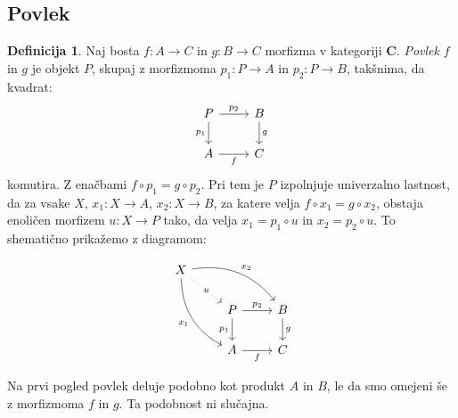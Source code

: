 \documentclass[12pt,a4paper]{book}
\theoremstyle{definition}
\newtheorem{definicija}{Definicija}[chapter]
\theoremstyle{plain}
\theoremstyle{definition}
\theoremstyle{remark}
\newcommand{\cat}[1]{\textbf{#1}}
\begin{document}
\subsection{Povlek}

\begin{definicija}
Naj bosta $f : A \to C$ in $g : B \to C$ morfizma v kategoriji $\cat{C}$. \emph{Povlek} $f$ in $g$ je objekt $P$, skupaj z morfizmoma $p_1 : P \to A$ in $p_2 : P \to B$, takšnima, da kvadrat:
$$
\begin{tikzcd}
P \ar[d, "p_1"'] \ar[r, "p_2"] & B \ar[d, "g"] \\
A \ar[r, "f"'] & C
\end{tikzcd}
$$
komutira. Z enačbami $f \circ p_1 = g \circ p_2$. Pri tem je $P$ izpolnjuje univerzalno lastnost, da za vsake $X$, $x_1 : X \to A$, $x_2 : X \to B$, za katere velja $f \circ x_1 = g \circ x_2$, obstaja enoličen morfizem $u : X \to P$ tako, da velja $x_1 = p_1 \circ u$ in $x_2 = p_2 \circ u$. To shematično prikažemo z diagramom:

$$\begin{tikzcd}
X
\arrow[drr, bend left, "x_2"]
\arrow[ddr, bend right, "x_1"']
\arrow[dr, dotted, "u" description] & & \\
& P \arrow[r, "p_2"] \arrow[d, "p_1"']
& B \arrow[d, "g"] \\
& A \arrow[r, "f"']
& C
\end{tikzcd}$$
\end{definicija}

Na prvi pogled povlek deluje podobno kot produkt $A$ in $B$, le da smo omejeni še z morfizmoma $f$ in $g$. Ta podobnost ni slučajna.
\end{document}
